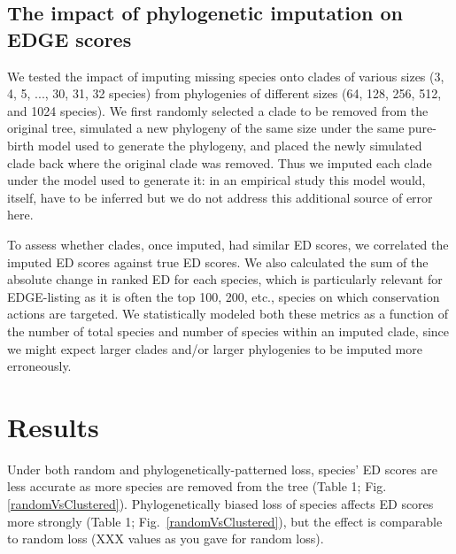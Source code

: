 \documentclass[12pt,english]{article}
\begin{document}
\subsection*{The impact of phylogenetic imputation on EDGE scores}
We tested the impact of imputing missing species onto clades of various sizes
(3, 4, 5, ..., 30, 31, 32 species) from phylogenies of different sizes
(64, 128, 256, 512, and 1024 species). We first randomly selected
a clade to be removed from the original tree, simulated a new phylogeny of
the same size under the same pure-birth model used to generate the phylogeny, and placed the newly
simulated clade back where the original clade was removed. Thus we imputed
each clade under the model used to generate it: in an empirical study this model
would, itself, have to be inferred but we do not address this
additional source of error here.

To assess whether clades, once imputed, had similar ED scores, we
correlated the imputed ED scores against true ED scores.
We also calculated the sum of the absolute change in ranked ED for
each species, which is particularly relevant for EDGE-listing as it is
often the top 100, 200, etc., species on which conservation actions
are targeted.
We statistically modeled both these metrics as a function of the
number of total species and number of species within an imputed clade,
since we might expect larger clades and/or larger phylogenies to be
imputed more erroneously.

\section*{Results}
Under both random and phylogenetically-patterned loss, species' ED
scores are less accurate as more species are removed from the tree
(Table 1; Fig. \ref{randomVsClustered}). 
Phylogenetically biased loss of species affects ED scores more
strongly (Table 1; Fig.\ \ref{randomVsClustered}), but the effect is
comparable to random loss (XXX values as you gave for random loss).
\end{document}
